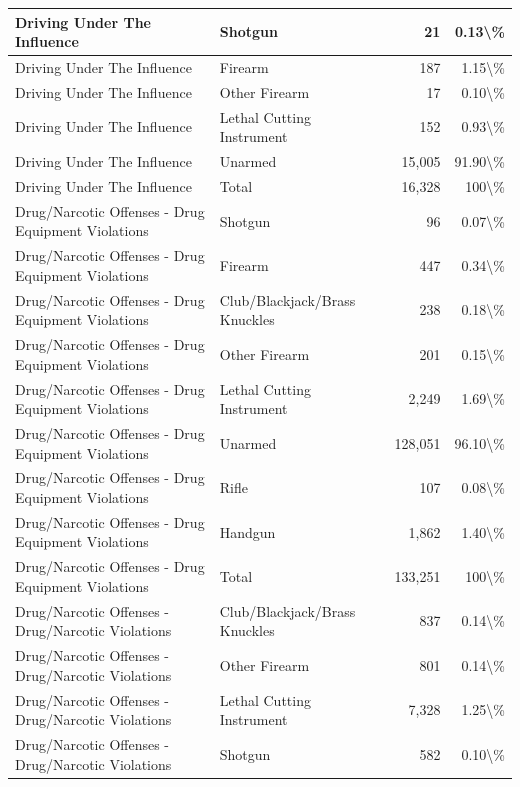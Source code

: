 \documentclass[
]{krantz}
\begin{document}
\begin{longtable}[t]{l|l|r|r}
\hline
Driving Under The Influence & Shotgun & 21 & 0.13\textbackslash{}\%\\
\hline
Driving Under The Influence & Firearm & 187 & 1.15\textbackslash{}\%\\
\hline
Driving Under The Influence & Other Firearm & 17 & 0.10\textbackslash{}\%\\
\hline
Driving Under The Influence & Lethal Cutting Instrument & 152 & 0.93\textbackslash{}\%\\
\hline
Driving Under The Influence & Unarmed & 15,005 & 91.90\textbackslash{}\%\\
\hline
Driving Under The Influence & Total & 16,328 & 100\textbackslash{}\%\\
\hline
Drug/Narcotic Offenses - Drug Equipment Violations & Shotgun & 96 & 0.07\textbackslash{}\%\\
\hline
Drug/Narcotic Offenses - Drug Equipment Violations & Firearm & 447 & 0.34\textbackslash{}\%\\
\hline
Drug/Narcotic Offenses - Drug Equipment Violations & Club/Blackjack/Brass Knuckles & 238 & 0.18\textbackslash{}\%\\
\hline
Drug/Narcotic Offenses - Drug Equipment Violations & Other Firearm & 201 & 0.15\textbackslash{}\%\\
\hline
Drug/Narcotic Offenses - Drug Equipment Violations & Lethal Cutting Instrument & 2,249 & 1.69\textbackslash{}\%\\
\hline
Drug/Narcotic Offenses - Drug Equipment Violations & Unarmed & 128,051 & 96.10\textbackslash{}\%\\
\hline
Drug/Narcotic Offenses - Drug Equipment Violations & Rifle & 107 & 0.08\textbackslash{}\%\\
\hline
Drug/Narcotic Offenses - Drug Equipment Violations & Handgun & 1,862 & 1.40\textbackslash{}\%\\
\hline
Drug/Narcotic Offenses - Drug Equipment Violations & Total & 133,251 & 100\textbackslash{}\%\\
\hline
Drug/Narcotic Offenses - Drug/Narcotic Violations & Club/Blackjack/Brass Knuckles & 837 & 0.14\textbackslash{}\%\\
\hline
Drug/Narcotic Offenses - Drug/Narcotic Violations & Other Firearm & 801 & 0.14\textbackslash{}\%\\
\hline
Drug/Narcotic Offenses - Drug/Narcotic Violations & Lethal Cutting Instrument & 7,328 & 1.25\textbackslash{}\%\\
\hline
Drug/Narcotic Offenses - Drug/Narcotic Violations & Shotgun & 582 & 0.10\textbackslash{}\%\\

\end{longtable}
\end{document}
